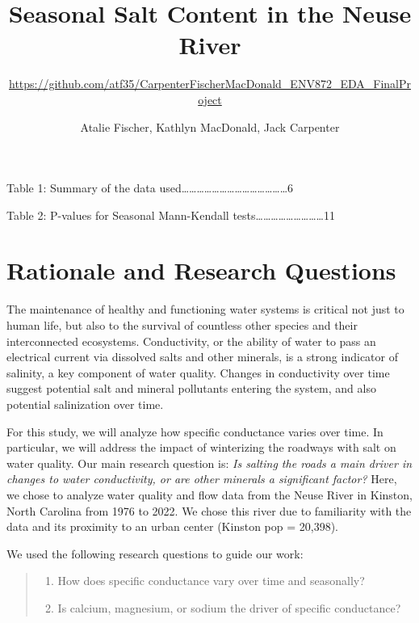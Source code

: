 \documentclass[
  12pt,
]{article}
\title{Seasonal Salt Content in the Neuse River}
\subtitle{\url{https://github.com/atf35/CarpenterFischerMacDonald_ENV872_EDA_FinalProject}}
\author{Atalie Fischer, Kathlyn MacDonald, Jack Carpenter}
\date{}
\providecommand{\tightlist}{%
  \setlength{\itemsep}{0pt}\setlength{\parskip}{0pt}}
\begin{document}
\maketitle

{
\setcounter{tocdepth}{2}
\tableofcontents
}
\newpage

\listoftables

Table 1: Summary of the data
used\ldots\ldots\ldots\ldots\ldots\ldots\ldots\ldots\ldots\ldots\ldots\ldots\ldots\ldots6

Table 2: P-values for Seasonal Mann-Kendall
tests\ldots\ldots\ldots\ldots\ldots\ldots\ldots\ldots\ldots11 \newpage

\listoffigures 
\newpage

\hypertarget{rationale-and-research-questions}{%
\section{Rationale and Research
Questions}\label{rationale-and-research-questions}}

The maintenance of healthy and functioning water systems is critical not
just to human life, but also to the survival of countless other species
and their interconnected ecosystems. Conductivity, or the ability of
water to pass an electrical current via dissolved salts and other
minerals, is a strong indicator of salinity, a key component of water
quality. Changes in conductivity over time suggest potential salt and
mineral pollutants entering the system, and also potential salinization
over time.

For this study, we will analyze how specific conductance varies over
time. In particular, we will address the impact of winterizing the
roadways with salt on water quality. Our main research question is:
\emph{Is salting the roads a main driver in changes to water
conductivity, or are other minerals a significant factor?} Here, we
chose to analyze water quality and flow data from the Neuse River in
Kinston, North Carolina from 1976 to 2022. We chose this river due to
familiarity with the data and its proximity to an urban center (Kinston
pop = 20,398).

We used the following research questions to guide our work:

\begin{quote}
\begin{enumerate}
\def\labelenumi{\arabic{enumi}.}
\tightlist
\item
  How does specific conductance vary over time and seasonally?
\item
  Is calcium, magnesium, or sodium the driver of specific conductance?
\end{enumerate}
\end{quote}
\end{document}
